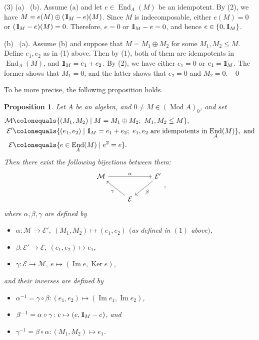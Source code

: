 \documentclass{surv-l}
\numberwithin{equation}{chapter}
\numberwithin{figure}{chapter}
\theoremstyle{plain}
\newtheorem{prp}[thm]{Proposition}
\theoremstyle{definition}
\theoremstyle{remark}
\newcommand{\id}{1\kern-.25em{\text{{\rm l}}}}
\newcommand{\Ar}[3]{\ar[from={#1}, to={#2}, #3]}
\DeclareMathOperator{\Ker}{Ker}
\DeclareMathOperator{\End}{End}
\DeclareMathOperator{\Mod}{Mod}
\begin{document}
(3) (a) \text{$\Rightarrow$}\  (b).  Assume (a) and let $e \in \End_A(M)$ be an idempotent.
By (2), we have $M = e(M) \oplus (\id_M - e)(M)$.
Since $M$ is indecomposable, either $e(M) = 0$ or $(\id_M - e)(M) = 0$.
Therefore, $e = 0$ or $\id_M - e = 0$, and hence $e \in \{0, \id_M\}$.

(b) \text{$\Rightarrow$}\  (a). Assume (b) and suppose that $M = M_1 \oplus M_2$ for some $M_1, M_2 \le M$.
Define $e_1, e_2$ as in (1) above.
Then by (1), both of them are idempotents in $\End_A(M)$, and $\id_M = e_1 + e_2$.
By (2), we have either $e_1 = 0$ or $e_1 = \id_M$.
The former shows that $M_1 = 0$, and
the latter shows that $e_2 = 0$ and $M_2 = 0$. \ \qed

\medskip
To be more precise, the following proposition holds.

\begin{prp}\label{prp:bijection-dsd-idp}
Let $A$ be an algebra, and $0 \ne M \in (\Mod A)_0$, and
set
\[
\begin{aligned}
\mathcal{M}&\colonequals  \{(M_1, M_2) \mid M = M_1 \oplus M_2;\  M_1, M_2 \le M\},\\
\mathcal{E}'&\colonequals  \{(e_1, e_2) \mid \id_M = e_1 + e_2;\  e_1, e_2 \text{ are idempotents in $\End_A(M)$}\},
\text{ and}\\
\mathcal{E}&\colonequals  \{e \in \End_A(M) \mid e^2 = e\}.
\end{aligned}
\]
Then there exist the following bijections between them:
\[
\begin{tikzcd}
\mathcal{M} && \mathcal{E}'\\
&\mathcal{E}
\Ar{1-1}{1-3}{"\alpha"}
\Ar{1-3}{2-2}{"\beta"}
\Ar{2-2}{1-1}{"\gamma"}
\end{tikzcd},
\]
where $\alpha, \beta, \gamma$ are defined by
\begin{itemize}
\item
$\alpha \colon \mathcal{M} \to \mathcal{E}', \ (M_1, M_2) \mapsto (e_1, e_2)$ $($as defined in $(1)$ above$)$,
\item
$\beta\colon \mathcal{E}' \to \mathcal{E},\ (e_1, e_2) \mapsto e_1$, 
\item
$\gamma \colon \mathcal{E} \to \mathcal{M}, \ e \mapsto (\operatorname{Im} e, \Ker e)$,
\end{itemize}
and their inverses are defined by
\begin{itemize}
\item
$\alpha^{-1} = \gamma\circ\beta \colon (e_1, e_2) \mapsto (\operatorname{Im} e_1, \operatorname{Im} e_2)$,
\item
$\beta^{-1} = \alpha\circ\gamma  \colon e \mapsto (e, \id_M -e)$, and
\item
$\gamma^{-1}  = \beta \circ \alpha \colon  (M_1, M_2) \mapsto e_1$.
\end{itemize}
\end{prp}
\end{document}
